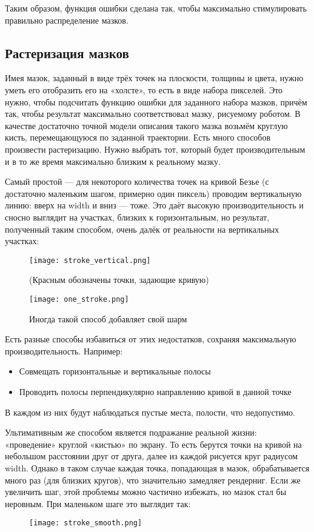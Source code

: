 Таким образом, функция ошибки сделана так, чтобы максимально стимулировать правильно распределение мазков.

\subsection{Растеризация мазков}\label{subsec:rasterization}
Имея мазок, заданный в виде трёх точек на плоскости, толщины и цвета, нужно уметь его отобразить его на «холсте», то есть в виде набора пикселей.
Это нужно, чтобы подсчитать функцию ошибки для заданного набора мазков,
причём так, чтобы результат максимально соответствовал мазку, рисуемому роботом.
В качестве достаточно точной модели описания такого мазка возьмём круглую кисть, перемещающуюся по заданной траектории.
Есть много способов произвести растеризацию.
Нужно выбрать тот, который будет производительным и в то же время максимально близким к реальному мазку.

Самый простой — для некоторого количества точек на кривой Безье (с достаточно маленьким шагом, примерно один пиксель) проводим вертикальную линию: вверх на width и  вниз — тоже.
Это даёт высокую производительность и сносно выглядит на участках, близких к горизонтальным, но результат, полученный таким способом, очень далёк от реальности на вертикальных участках:
\begin{figure}[h!]
    \centering
    \texttt{[image: stroke\_vertical.png]}
    \caption{(Красным обозначены точки, задающие кривую)}
    \label{fig:vertical_stroke}
\end{figure}
\FloatBarrier


\begin{figure}[h!]
    \centering
    \texttt{[image: one\_stroke.png]}
    \caption{Иногда такой способ добавляет свой шарм}
    \label{fig:pretty_vert_stroke}
\end{figure}
\FloatBarrier


Есть разные способы избавиться от этих недостатков, сохраняя максимальную производительность.
Например:
\begin{itemize}
    \item Совмещать горизонтальные и вертикальные полосы
    \item Проводить полосы перпендикулярно направлению кривой в данной точке
\end{itemize}
В каждом из них будут наблюдаться пустые места, полости, что недопустимо.

Ультимативным же способом является подражание реальной жизни: «проведение» круглой «кистью» по экрану.
То есть берутся точки на кривой на небольшом расстоянии друг от друга, далее из каждой рисуется круг радиусом width.
Однако в таком случае каждая точка, попадающая в мазок, обрабатывается много раз (для близких кругов), что значительно замедляет рендерниг.
Если же увеличить шаг, этой проблемы можно частично избежать, но мазок стал бы неровным.
При маленьком шаге это выглядит так:
\begin{figure}[h!]
    \centering
    \texttt{[image: stroke\_smooth.png]}
    \label{fig:smooth_stroke}
\end{figure}
\FloatBarrier

